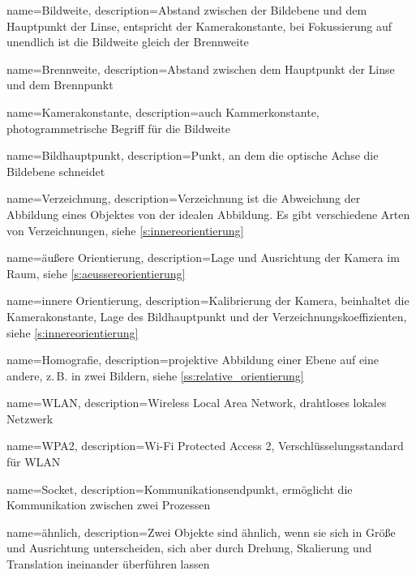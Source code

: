 
{
    name=Bildweite,
    description={Abstand zwischen der Bildebene und dem Hauptpunkt der Linse, entspricht der \Gls{Kamerakonstante}, bei Fokussierung auf unendlich ist die Bildweite gleich der \Gls{Brennweite}}
}

{
    name=Brennweite,
    description={Abstand zwischen dem Hauptpunkt der Linse und dem Brennpunkt}
}

{
    name=Kamerakonstante,
    description={auch Kammerkonstante, photogrammetrische Begriff für die Bildweite}
}

{
    name=Bildhauptpunkt,
    description={Punkt, an dem die optische Achse die Bildebene schneidet}
}

{
    name=Verzeichnung,
    description={Verzeichnung ist die Abweichung der Abbildung eines Objektes von der idealen Abbildung. Es gibt verschiedene Arten von Verzeichnungen, siehe \autoref{s:innereorientierung}
        }
}

{
    name=äußere Orientierung,
    description={Lage und Ausrichtung der Kamera im Raum, siehe \autoref{s:aeussereorientierung}}
}

{
    name=innere Orientierung,
    description={Kalibrierung der Kamera, beinhaltet die \Gls{Kamerakonstante}, Lage des \Gls{Bildhauptpunkt} und der Verzeichnungskoeffizienten, siehe \autoref{s:innereorientierung}}
}

{
    name=Homografie,
    description={projektive Abbildung einer Ebene auf eine andere, z.\,B. in zwei Bildern, siehe \autoref{ss:relative_orientierung}}
}


{
    name=WLAN,
    description={Wireless Local Area Network, drahtloses lokales Netzwerk}
}

{
    name=WPA2,
    description={Wi-Fi Protected Access 2, Verschlüsselungsstandard für \Gls{WLAN}}
}

{
    name=Socket,
    description={Kommunikationsendpunkt, ermöglicht die Kommunikation zwischen zwei Prozessen}
}

{   
    name=ähnlich,
    description={Zwei Objekte sind ähnlich, wenn sie sich in Größe und Ausrichtung unterscheiden, sich aber durch Drehung, Skalierung und Translation ineinander überführen lassen}
}


